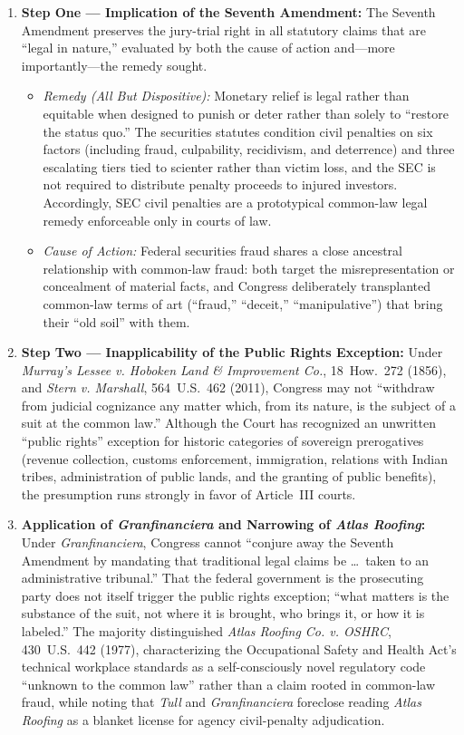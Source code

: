 \documentclass[12pt]{article}
\begin{document}
\begin{enumerate}
  \item \textbf{Step One --- Implication of the Seventh Amendment:} The Seventh Amendment preserves the jury-trial right in all statutory claims that are ``legal in nature,'' evaluated by both the cause of action and---more importantly---the remedy sought.
  \begin{itemize}
    \item \textit{Remedy (All But Dispositive):} Monetary relief is legal rather than equitable when designed to punish or deter rather than solely to ``restore the status quo.'' The securities statutes condition civil penalties on six factors (including fraud, culpability, recidivism, and deterrence) and three escalating tiers tied to scienter rather than victim loss, and the SEC is not required to distribute penalty proceeds to injured investors. Accordingly, SEC civil penalties are a prototypical common-law legal remedy enforceable only in courts of law.
    \item \textit{Cause of Action:} Federal securities fraud shares a close ancestral relationship with common-law fraud: both target the misrepresentation or concealment of material facts, and Congress deliberately transplanted common-law terms of art (``fraud,'' ``deceit,'' ``manipulative'') that bring their ``old soil'' with them.
  \end{itemize}
  \item \textbf{Step Two --- Inapplicability of the Public Rights Exception:} Under \textit{Murray's Lessee v. Hoboken Land \& Improvement Co.}, 18~How.~272 (1856), and \textit{Stern v. Marshall}, 564~U.S.~462 (2011), Congress may not ``withdraw from judicial cognizance any matter which, from its nature, is the subject of a suit at the common law.'' Although the Court has recognized an unwritten ``public rights'' exception for historic categories of sovereign prerogatives (revenue collection, customs enforcement, immigration, relations with Indian tribes, administration of public lands, and the granting of public benefits), the presumption runs strongly in favor of Article~III courts.
  \item \textbf{Application of \textit{Granfinanciera} and Narrowing of \textit{Atlas Roofing}:} Under \textit{Granfinanciera}, Congress cannot ``conjure away the Seventh Amendment by mandating that traditional legal claims be \ldots\ taken to an administrative tribunal.'' That the federal government is the prosecuting party does not itself trigger the public rights exception; ``what matters is the substance of the suit, not where it is brought, who brings it, or how it is labeled.'' The majority distinguished \textit{Atlas Roofing Co. v. OSHRC}, 430~U.S.~442 (1977), characterizing the Occupational Safety and Health Act's technical workplace standards as a self-consciously novel regulatory code ``unknown to the common law'' rather than a claim rooted in common-law fraud, while noting that \textit{Tull} and \textit{Granfinanciera} foreclose reading \textit{Atlas Roofing} as a blanket license for agency civil-penalty adjudication.
\end{enumerate}
\end{document}
